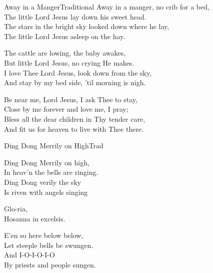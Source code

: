 \documentclass[a4paper,12pt]{article}
\begin{document}
\begin{song}{Away in a Manger}{Traditional}
 Away in a manger, no crib for a bed,\\
The little Lord Jesus lay down his sweet head.\\
The stars in the bright sky looked down where he lay,\\
The little Lord Jesus asleep on the hay.
\bigskip\par
The cattle are lowing, the baby awakes,\\
But little Lord Jesus, no crying He makes.\\
I love Thee Lord Jesus, look down from the sky,\\
And stay by my bed side, 'til morning is nigh.
\bigskip\par
Be near me, Lord Jesus, I ask Thee to stay,\\
Close by me forever and love me, I pray;\\
Bless all the dear children in Thy tender care,\\
And fit us for heaven to live with Thee there.
\end{song}

\relax

\begin{song}{Ding Dong Merrily on High}{Trad}

Ding Dong Merrily on high,\\
In heav'n the bells are ringing.\\
Ding Dong verily the sky\\
Is riven with angels singing

\bigskip

Glo-ria,\\
Hosanna in excelsis.
\bigskip

E'en so here below below,\\
Let steeple bells be swungen.\\
And I-O-I-O-I-O\\
By priests and people sungen. 
\end{song}

\relax
\end{document}
